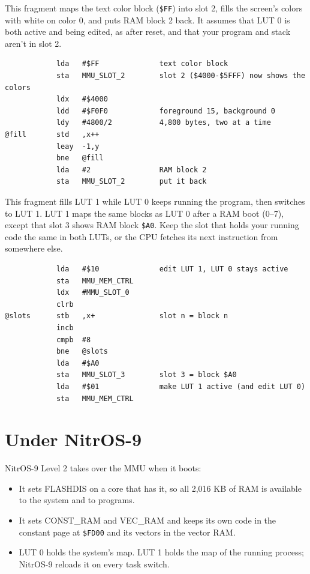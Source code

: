 This fragment maps the text color block (\verb+$FF+) into slot 2, fills the screen's colors with white on color 0, and puts RAM block 2 back. It assumes that LUT 0 is both active and being edited, as after reset, and that your program and stack aren't in slot 2.

\begin{verbatim}
            lda   #$FF              text color block
            sta   MMU_SLOT_2        slot 2 ($4000-$5FFF) now shows the colors
            ldx   #$4000
            ldd   #$F0F0            foreground 15, background 0
            ldy   #4800/2           4,800 bytes, two at a time
@fill       std   ,x++
            leay  -1,y
            bne   @fill
            lda   #2                RAM block 2
            sta   MMU_SLOT_2        put it back
\end{verbatim}


This fragment fills LUT 1 while LUT 0 keeps running the program, then switches to LUT 1. LUT 1 maps the same blocks as LUT 0 after a RAM boot (0--7), except that slot 3 shows RAM block \verb+$A0+. Keep the slot that holds your running code the same in both LUTs, or the CPU fetches its next instruction from somewhere else.

\begin{verbatim}
            lda   #$10              edit LUT 1, LUT 0 stays active
            sta   MMU_MEM_CTRL
            ldx   #MMU_SLOT_0
            clrb
@slots      stb   ,x+               slot n = block n
            incb
            cmpb  #8
            bne   @slots
            lda   #$A0
            sta   MMU_SLOT_3        slot 3 = block $A0
            lda   #$01              make LUT 1 active (and edit LUT 0)
            sta   MMU_MEM_CTRL
\end{verbatim}

\section{Under NitrOS-9}
\label{sec:mem_nos9}

NitrOS-9 Level 2 takes over the MMU when it boots:

\begin{itemize}
    \item It sets FLASHDIS on a core that has it, so all 2,016 KB of RAM is available to the system and to programs.
    \item It sets CONST\_RAM and VEC\_RAM and keeps its own code in the constant page at \verb+$FD00+ and its vectors in the vector RAM.
    \item LUT 0 holds the system's map. LUT 1 holds the map of the running process; NitrOS-9 reloads it on every task switch.
\end{itemize}

